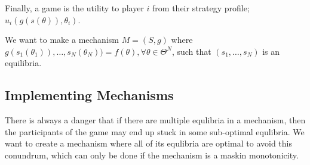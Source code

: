 Finally, a game is the utility to player $i$ from their strategy
profile; $u_i(g(s(\theta)), \theta_i)$.

We want to make a mechanism $M = (S,g)$ where
$g(s_1(\theta_1)), \dots, s_N(\theta_N)) =
f(\theta), \forall \theta \in \Theta^N$, such that $(s_1,\dots,s_N)$
is an equilibria.

\subsection{Implementing Mechanisms}

There is always a danger that if there are multiple equlibria in a
mechanism, then the participants of the game may end up stuck in some
sub-optimal equlibria. We want to create a mechanism where all of its
equlibria are optimal to avoid this conundrum, which can only be done
if the mechanism is a maskin monotonicity.



